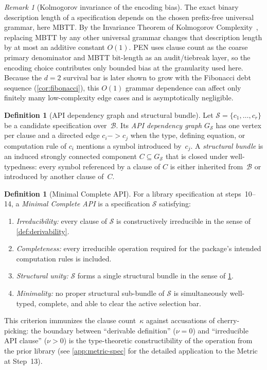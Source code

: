 \documentclass[11pt,a4paper]{article}
\def\to{->}%
\theoremstyle{plain}
\theoremstyle{definition}
\newtheorem{definition}[theorem]{Definition}
\theoremstyle{remark}
\newtheorem{remark}[theorem]{Remark}
\begin{document}
\begin{remark}[Kolmogorov invariance of the encoding bias]
\label{rem:kappa-invariance}
The exact binary description length of a specification depends on the chosen prefix-free universal grammar, here MBTT.
By the Invariance Theorem of Kolmogorov Complexity~\cite{kolmogorov}, replacing MBTT by any other universal grammar changes that description length by at most an additive constant $O(1)$.
PEN uses clause count as the coarse primary denominator and MBTT bit-length as an audit/tiebreak layer, so the encoding choice contributes only bounded bias at the granularity used here.
Because the $d=2$ survival bar is later shown to grow with the Fibonacci debt sequence (\cref{cor:fibonacci}), this $O(1)$ grammar dependence can affect only finitely many low-complexity edge cases and is asymptotically negligible.
\end{remark}

\begin{definition}[API dependency graph and structural bundle]
\label{def:api-graph}
Let $\mathcal{S}=\{c_1,\dots,c_r\}$ be a candidate specification over~$\mathcal{B}$.
Its \emph{API dependency graph} $G_{\mathcal{S}}$ has one vertex per clause and a directed edge $c_i \to c_j$ when the type, defining equation, or computation rule of $c_i$ mentions a symbol introduced by~$c_j$.
A \emph{structural bundle} is an induced strongly connected component $C \subseteq G_{\mathcal{S}}$ that is closed under well-typedness: every symbol referenced by a clause of $C$ is either inherited from~$\mathcal{B}$ or introduced by another clause of~$C$.
\end{definition}

\begin{definition}[Minimal Complete API]
\label{def:minimal-api}
For a library specification at steps~10--14, a \emph{Minimal Complete API} is a specification $\mathcal{S}$ satisfying:
\begin{enumerate}[nosep]
    \item \emph{Irreducibility:} every clause of $\mathcal{S}$ is constructively irreducible in the sense of \cref{def:derivability}.
    \item \emph{Completeness:} every irreducible operation required for the package's intended computation rules is included.
    \item \emph{Structural unity:} $\mathcal{S}$ forms a single structural bundle in the sense of \cref{def:api-graph}.
    \item \emph{Minimality:} no proper structural sub-bundle of $\mathcal{S}$ is simultaneously well-typed, complete, and able to clear the active selection bar.
\end{enumerate}
This criterion immunizes the clause count~$\kappa$ against accusations of cherry-picking: the boundary between ``derivable definition'' ($\nu = 0$) and ``irreducible API clause'' ($\nu > 0$) is the type-theoretic constructibility of the operation from the prior library (see \cref{app:metric-spec} for the detailed application to the Metric at Step~13).
\end{definition}
\end{document}
